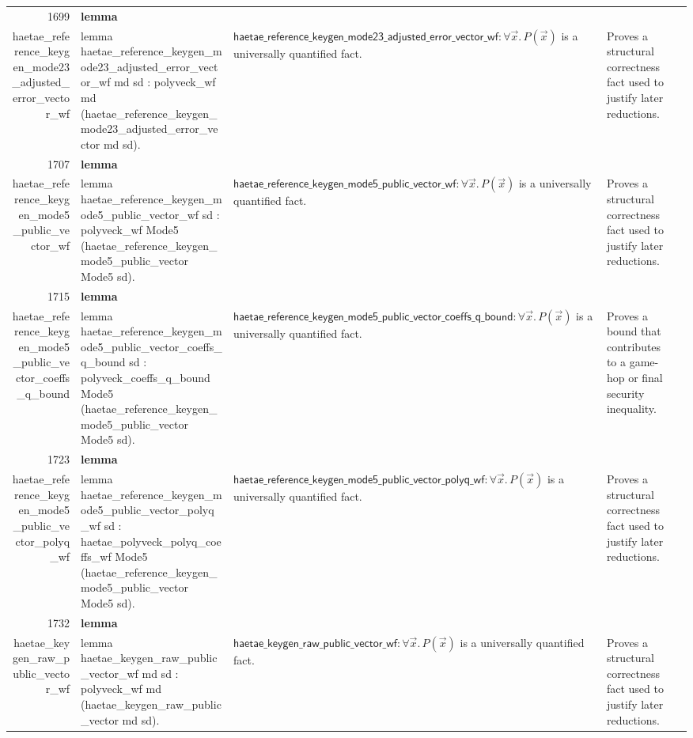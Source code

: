 \documentclass[10pt]{article}
\newcommand{\ec}[1]{\begingroup\ttfamily\scriptsize #1\endgroup}
\begin{document}
\begin{longtable}{r L{0.17\textwidth} L{0.26\textwidth} L{0.27\textwidth} L{0.20\textwidth}}
1699 & \textbf{lemma}\\\ec{haetae\_reference\_keygen\_mode23\_adjusted\_error\_vector\_wf} & \ec{lemma haetae\_reference\_keygen\_mode23\_adjusted\_error\_vector\_wf md sd : polyveck\_wf md (haetae\_reference\_keygen\_mode23\_adjusted\_error\_vector md sd).} & \(\mathsf{haetae\_reference\_keygen\_mode23\_adjusted\_error\_vector\_wf} : \forall \vec{x}.\, P(\vec{x})\) is a universally quantified fact. & Proves a structural correctness fact used to justify later reductions. \\
1707 & \textbf{lemma}\\\ec{haetae\_reference\_keygen\_mode5\_public\_vector\_wf} & \ec{lemma haetae\_reference\_keygen\_mode5\_public\_vector\_wf sd : polyveck\_wf Mode5 (haetae\_reference\_keygen\_mode5\_public\_vector Mode5 sd).} & \(\mathsf{haetae\_reference\_keygen\_mode5\_public\_vector\_wf} : \forall \vec{x}.\, P(\vec{x})\) is a universally quantified fact. & Proves a structural correctness fact used to justify later reductions. \\
1715 & \textbf{lemma}\\\ec{haetae\_reference\_keygen\_mode5\_public\_vector\_coeffs\_q\_bound} & \ec{lemma haetae\_reference\_keygen\_mode5\_public\_vector\_coeffs\_q\_bound sd : polyveck\_coeffs\_q\_bound Mode5 (haetae\_reference\_keygen\_mode5\_public\_vector Mode5 sd).} & \(\mathsf{haetae\_reference\_keygen\_mode5\_public\_vector\_coeffs\_q\_bound} : \forall \vec{x}.\, P(\vec{x})\) is a universally quantified fact. & Proves a bound that contributes to a game-hop or final security inequality. \\
1723 & \textbf{lemma}\\\ec{haetae\_reference\_keygen\_mode5\_public\_vector\_polyq\_wf} & \ec{lemma haetae\_reference\_keygen\_mode5\_public\_vector\_polyq\_wf sd : haetae\_polyveck\_polyq\_coeffs\_wf Mode5 (haetae\_reference\_keygen\_mode5\_public\_vector Mode5 sd).} & \(\mathsf{haetae\_reference\_keygen\_mode5\_public\_vector\_polyq\_wf} : \forall \vec{x}.\, P(\vec{x})\) is a universally quantified fact. & Proves a structural correctness fact used to justify later reductions. \\
1732 & \textbf{lemma}\\\ec{haetae\_keygen\_raw\_public\_vector\_wf} & \ec{lemma haetae\_keygen\_raw\_public\_vector\_wf md sd : polyveck\_wf md (haetae\_keygen\_raw\_public\_vector md sd).} & \(\mathsf{haetae\_keygen\_raw\_public\_vector\_wf} : \forall \vec{x}.\, P(\vec{x})\) is a universally quantified fact. & Proves a structural correctness fact used to justify later reductions. \\

\end{longtable}
\end{document}

